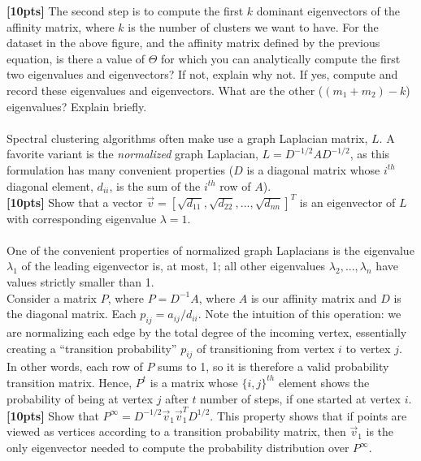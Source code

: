 \documentclass[paper=a4, fontsize=11pt]{scrartcl} %
\numberwithin{figure}{section} %
\numberwithin{table}{section} %
\begin{document}
\textbf{[10pts]} The second step is to compute the first $k$ dominant eigenvectors of the affinity matrix, where $k$ is the number of clusters we want to have. For the dataset in the above figure, and the affinity matrix defined by the previous equation, is there a value of $\Theta$ for which you can analytically compute the first two eigenvalues and eigenvectors? If not, explain why not. If yes, compute and record these eigenvalues and eigenvectors. What are the other ($(m_1 + m_2) - k$) eigenvalues? Explain briefly. \\\\

Spectral clustering algorithms often make use a graph Laplacian matrix, $L$. A favorite variant is the \emph{normalized} graph Laplacian, $L = D^{-1/2}AD^{-1/2}$, as this formulation has many convenient properties ($D$ is a diagonal matrix whose $i^{th}$ diagonal element, $d_{ii}$, is the sum of the $i^{th}$ row of $A$). \\

\textbf{[10pts]} Show that a vector $\vec{v} = \left[ \sqrt{d_{11}}, \sqrt{d_{22}}, ..., \sqrt{d_{nn}} \right]^T$ is an eigenvector of $L$ with corresponding eigenvalue $\lambda = 1$. \\\\

One of the convenient properties of normalized graph Laplacians is the eigenvalue $\lambda_1$ of the leading eigenvector is, at most, 1; all other eigenvalues $\lambda_2, ..., \lambda_n$ have values strictly smaller than 1. \\

Consider a matrix $P$, where $P = D^{-1}A$, where $A$ is our affinity matrix and $D$ is the diagonal matrix. Each $p_{ij} = a_{ij} / d_{ii}$. Note the intuition of this operation: we are normalizing each edge by the total degree of the incoming vertex, essentially creating a ``transition probability'' $p_{ij}$ of transitioning from vertex $i$ to vertex $j$. In other words, each row of $P$ sums to 1, so it is therefore a valid probability transition matrix. Hence, $P^t$ is a matrix whose $\{i, j\}^{th}$ element shows the probability of being at vertex $j$ after $t$ number of steps, if one started at vertex $i$. \\

\textbf{[10pts]} Show that $P^{\infty} = D^{-1/2} \vec{v}_1 \vec{v}_1^T D^{1/2}$. This property shows that if points are viewed as vertices according to a transition probability matrix, then $\vec{v}_1$ is the only eigenvector needed to compute the probability distribution over $P^{\infty}$. \\
\end{document}
